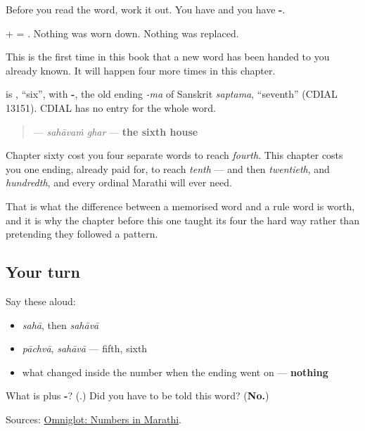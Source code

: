 Before you read the word, work it out. You have \textbf{} and you have \textbf{-}.

\textbf{} + \textbf{} = \textbf{}. Nothing was worn down. Nothing was replaced.

This is the first time in this book that a new word has been handed to you already known. It will happen four more times in this chapter.

\begin{cousinweb}
\textbf{} is \textbf{}, \textquotedblleft{}six\textquotedblright{}, with \textbf{-}, the old ending \emph{-ma} of Sanskrit \emph{saptama}, \textquotedblleft{}seventh\textquotedblright{} (CDIAL 13151). CDIAL has no entry for the whole word.
\end{cousinweb}

\begin{grammarlens}[title={Grammar Lens: what a rule buys}]
\begin{quote}
\textbf{ } — \emph{sahāvaṁ ghar} — \textbf{the sixth house}
\end{quote}

Chapter sixty cost you four separate words to reach \emph{fourth}. This chapter costs you one ending, already paid for, to reach \emph{tenth} — and then \emph{twentieth}, and \emph{hundredth}, and every ordinal Marathi will ever need.

That is what the difference between a memorised word and a rule word is worth, and it is why the chapter before this one taught its four the hard way rather than pretending they followed a pattern.
\end{grammarlens}

\subsection*{Your turn}
Say these aloud:

\begin{itemize}
\raggedright
  \item \emph{sahā}, then \emph{sahāvā}
  \item \emph{pāchvā}, \emph{sahāvā} — fifth, sixth
  \item what changed inside the number when the ending went on — \textbf{nothing}
\end{itemize}

\begin{tcolorbox}[breakable,colback=teal!4,colframe=teal!35!black,title={Before you move on}]
What is \textbf{} plus \textbf{-}? (\textbf{}.) Did you have to be told this word? (\textbf{No.})

Sources: \href{https://www.omniglot.com/language/numbers/marathi.htm}{Omniglot: Numbers in Marathi}.
\end{tcolorbox}
